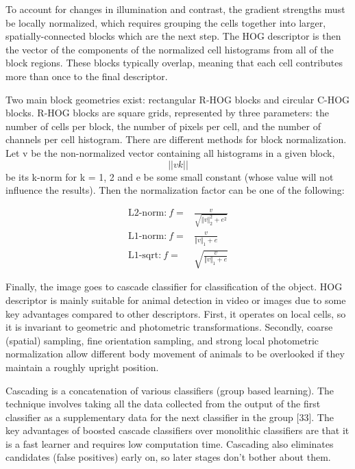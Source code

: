 \documentclass[14pt,a4paper,final]{extreport}
\begin{document}
\item To account for changes in illumination and contrast, the gradient strengths must be locally normalized, which requires grouping the cells together into larger, spatially-connected blocks which are the next step. The HOG descriptor is then the vector of the components of the normalized cell histograms from all of the block regions. These blocks typically overlap, meaning that each cell contributes more than once to the final descriptor.

\item Two main block geometries exist: rectangular R-HOG blocks and circular C-HOG blocks. R-HOG blocks are square grids, represented by three parameters: the number of cells per block, the number of pixels per cell, and the number of channels per cell histogram. There are different methods for block normalization. Let v be the non-normalized vector containing all histograms in a given block, \[||vk||\] be its k-norm for k = 1, 2 and e be some small constant (whose value will not influence the results). Then the normalization factor can be one of the following:

\begin{align*} \text {L2-norm:}~f=&\frac {v}{\sqrt {\Vert v\Vert ^{2}_{2}+e^{2}}} \\ \text {L1-norm:}~f=&\frac {v}{\Vert v\Vert _{1}+e} \\ \text {L1-sqrt:}~f=&\sqrt {\frac {v}{\Vert v\Vert _{1}+e}} \end{align*}

Finally, the image goes to cascade classifier for classification of the object. HOG descriptor is mainly suitable for animal detection in video or images due to some key advantages compared to other descriptors. First, it operates on local cells, so it is invariant to geometric and photometric transformations. Secondly, coarse (spatial) sampling, fine orientation sampling, and strong local photometric normalization allow different body movement of animals to be overlooked if they maintain a roughly upright position.

Cascading is a concatenation of various classifiers (group based learning). The technique involves taking all the data collected from the output of the first classifier as a supplementary data for the next classifier in the group [33]. The key advantages of boosted cascade classifiers over monolithic classifiers are that it is a fast learner and requires low computation time. Cascading also eliminates candidates (false positives) early on, so later stages don’t bother about them.
\end{document}

